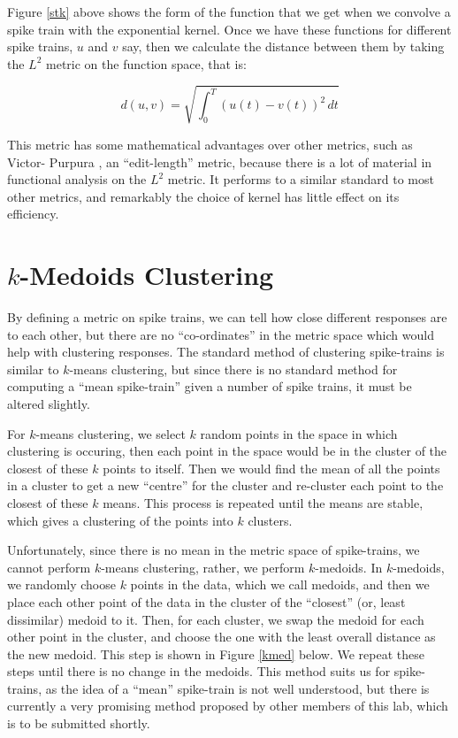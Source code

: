 \documentclass[a4paper,12pt]{report}
\begin{document}
Figure \ref{stk} above shows the form of the function that we get when we 
convolve a spike train with the exponential kernel.  Once we have these 
functions for different spike trains, $u$ and $v$ say, then we calculate the 
distance between them by taking the $L^2$ metric on the function space, that is:

\begin{equation}
d(u,v) = \sqrt{\int_0^T (u(t) - v(t))^2\,dt}
\end{equation}



This metric has some mathematical advantages over other metrics, such as Victor-
Purpura \cite{VictorPurpura1997a}, an ``edit-length'' metric, because there is 
a lot of material in functional analysis on the $L^2$ metric.  It performs to a 
similar standard to most other metrics, and remarkably the choice of kernel has 
little effect on its efficiency.


\section{$k$-Medoids Clustering}

By defining a metric on spike trains, we can tell how close different responses 
are to each other, but there are no ``co-ordinates'' in the metric space which 
would help with clustering responses.  The standard method of clustering 
spike-trains is similar to $k$-means clustering, but since there is no standard 
method for computing a ``mean spike-train'' given a number of spike trains, it 
must be altered slightly.

For $k$-means clustering, we select $k$ random points in the space in which 
clustering is occuring, then each point in the space would be in the cluster of 
the closest of these $k$ points to itself.  Then we would find the mean of all 
the points in a cluster to get a new ``centre'' for the cluster and re-cluster 
each point to the closest of these $k$ means.  This process is repeated until 
the means are stable, which gives a clustering of the points into $k$ clusters.

Unfortunately, since there is no mean in the metric space of spike-trains, we 
cannot perform $k$-means clustering, rather, we perform $k$-medoids.  In 
$k$-medoids, we randomly choose $k$ points in the data, which we call medoids, 
and then we place each other point of the data in the cluster of the 
``closest'' (or, least dissimilar) medoid to it.  Then, for each cluster, we 
swap the medoid for each other point in the cluster, and choose the one with 
the least overall distance as the new medoid. This step is shown in Figure 
\ref{kmed} below. We repeat these steps until there is no change in the 
medoids.  This method suits us for spike-trains, as the idea of a ``mean'' 
spike-train is not well understood, but there is currently a very promising 
method proposed by other members of this lab, which is to be submitted shortly.
\end{document}
